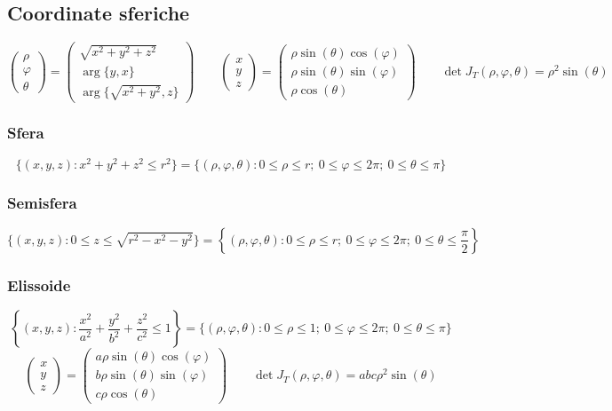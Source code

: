 \documentclass[]{article}
\newcommand{\xyz}{(x,y,z):}
\newcommand{\rpt}{(\rho,\varphi,\theta):}
\begin{document}
\subsection{Coordinate sferiche}
\[
\left(\begin{array}{c}
\rho \\ \varphi \\ \theta
\end{array}\right)=\left(\begin{array}{c}
\sqrt{x^2+y^2+z^2} \\ \arg\{y,x\} \\ \arg\{\sqrt{x^2+y^2},z\}
\end{array}\right) \qquad
\left(\begin{array}{c}
x \\ y \\ z
\end{array}\right)=\left(\begin{array}{c}
\rho\sin(\theta)\cos(\varphi) \\ \rho\sin(\theta)\sin(\varphi) \\ \rho\cos(\theta)
\end{array}\right) \qquad
\det J_T(\rho,\varphi,\theta)=\rho^2 \sin(\theta)
\]

\subsubsection{Sfera}
\[
\{\xyz x^2+y^2+z^2 \le r^2\}=\{\rpt 0 \le\rho\le r; \ 0 \le\varphi\le 2\pi; \ 0 \le\theta\le \pi \}
\]

\subsubsection{Semisfera}
\[
\{\xyz 0 \le z \le \sqrt{r^2-x^2-y^2}\}=\left\{\rpt 0 \le\rho\le r; \ 0 \le\varphi\le 2\pi; \ 0 \le\theta\le \frac{\pi}{2} \right\}
\]

\subsubsection{Elissoide}
\[
\left\{\xyz \frac{x^2}{a^2}+\frac{y^2}{b^2}+\frac{z^2}{c^2} \le 1 \right\}=\{\rpt 0 \le\rho\le 1; \ 0 \le\varphi\le 2\pi; \ 0 \le\theta\le \pi \}
\]
\[
\left(\begin{array}{c}
x \\ y \\ z
\end{array}\right)=\left(\begin{array}{c}
a\rho\sin(\theta)\cos(\varphi) \\ b\rho\sin(\theta)\sin(\varphi) \\ c\rho\cos(\theta)
\end{array}\right) \qquad
\det J_T(\rho,\varphi,\theta)=a b c \rho^2 \sin(\theta)
\]
\end{document}
